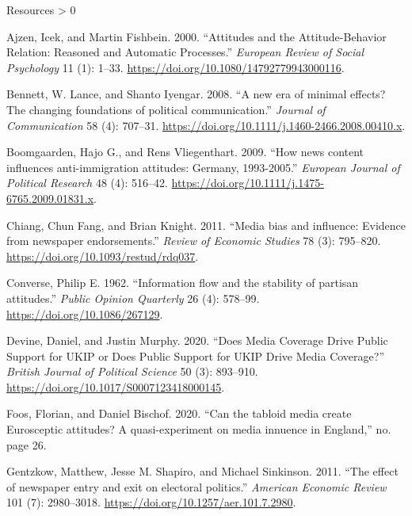 \documentclass[
  ignorenonframetext,
]{beamer}
\newlength{\cslhangindent}
\newenvironment{CSLReferences}[2] %
 {%
  \setlength{\parindent}{0pt}
  \ifodd #1 \everypar{\setlength{\hangindent}{\cslhangindent}}\ignorespaces\fi
  \ifnum #2 > 0
  \setlength{\parskip}{#2\baselineskip}
  \fi
 }%
 {}
\begin{document}
\begin{frame}[allowframebreaks]{Resources}
\hypertarget{refs}{}
\begin{CSLReferences}{1}{0}
\leavevmode\hypertarget{ref-Ajzen2000}{}%
Ajzen, Icek, and Martin Fishbein. 2000. {``{Attitudes and the
Attitude-Behavior Relation: Reasoned and Automatic Processes}.''}
\emph{European Review of Social Psychology} 11 (1): 1--33.
\url{https://doi.org/10.1080/14792779943000116}.

\leavevmode\hypertarget{ref-Bennett2008}{}%
Bennett, W. Lance, and Shanto Iyengar. 2008. {``{A new era of minimal
effects? The changing foundations of political communication}.''}
\emph{Journal of Communication} 58 (4): 707--31.
\url{https://doi.org/10.1111/j.1460-2466.2008.00410.x}.

\leavevmode\hypertarget{ref-Boomgaarden2009}{}%
Boomgaarden, Hajo G., and Rens Vliegenthart. 2009. {``{How news content
influences anti-immigration attitudes: Germany, 1993-2005}.''}
\emph{European Journal of Political Research} 48 (4): 516--42.
\url{https://doi.org/10.1111/j.1475-6765.2009.01831.x}.

\leavevmode\hypertarget{ref-Chiang2011a}{}%
Chiang, Chun Fang, and Brian Knight. 2011. {``{Media bias and influence:
Evidence from newspaper endorsements}.''} \emph{Review of Economic
Studies} 78 (3): 795--820. \url{https://doi.org/10.1093/restud/rdq037}.

\leavevmode\hypertarget{ref-Converse1962}{}%
Converse, Philip E. 1962. {``{Information flow and the stability of
partisan attitudes}.''} \emph{Public Opinion Quarterly} 26 (4): 578--99.
\url{https://doi.org/10.1086/267129}.

\leavevmode\hypertarget{ref-Devine2020}{}%
Devine, Daniel, and Justin Murphy. 2020. {``{Does Media Coverage Drive
Public Support for UKIP or Does Public Support for UKIP Drive Media
Coverage?}''} \emph{British Journal of Political Science} 50 (3):
893--910. \url{https://doi.org/10.1017/S0007123418000145}.

\leavevmode\hypertarget{ref-Foos2020}{}%
Foos, Florian, and Daniel Bischof. 2020. {``{Can the tabloid media
create Eurosceptic attitudes? A quasi-experiment on media innuence in
England},''} no. page 26.

\leavevmode\hypertarget{ref-Gentzkow2011}{}%
Gentzkow, Matthew, Jesse M. Shapiro, and Michael Sinkinson. 2011.
{``{The effect of newspaper entry and exit on electoral politics}.''}
\emph{American Economic Review} 101 (7): 2980--3018.
\url{https://doi.org/10.1257/aer.101.7.2980}.


\end{CSLReferences}
\end{frame}
\end{document}
